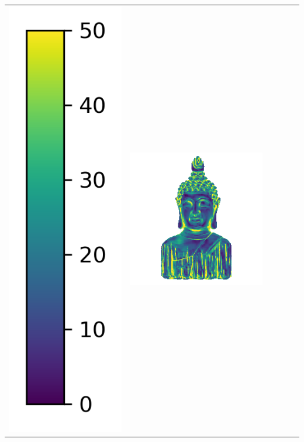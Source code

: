 \begin{center}
\begin{tabularx}{\linewidth}{@{}Y@{}Y@{}Y@{}Y@{}Y@{}Y@{}}
\includegraphics[width=0.2\linewidth]{semisynthetic/colorbar_error_vertical.png} &
\includegraphics[width=\linewidth]{semisynthetic/20150514_16_ours_err.png} &

\end{tabularx}
\end{center}
